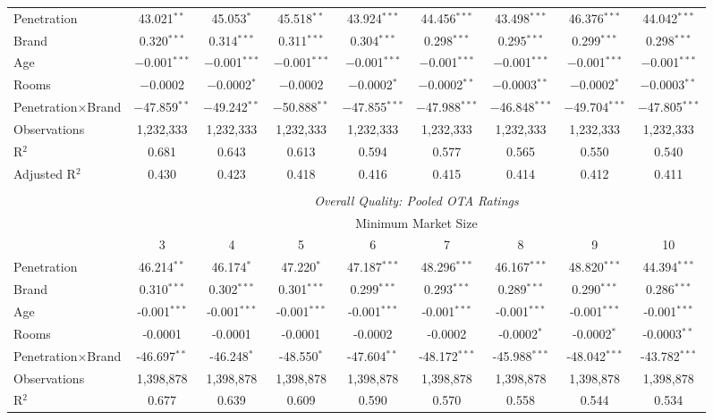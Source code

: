 \begin{table}[!htbp]
\begin{sideways}
{\begin{tabular}{@{\extracolsep{5pt}}lcccccccc}
\hline 
 Penetration & 43.021$^{**}$ & 45.053$^{*}$ & 45.518$^{**}$ & 43.924$^{***}$ & 44.456$^{***}$ & 43.498$^{***}$ & 46.376$^{***}$ & 44.042$^{***}$ \\  
  Brand & 0.320$^{***}$ & 0.314$^{***}$ & 0.311$^{***}$ & 0.304$^{***}$ & 0.298$^{***}$ & 0.295$^{***}$ & 0.299$^{***}$ & 0.298$^{***}$ \\   
  Age & $-$0.001$^{***}$ & $-$0.001$^{***}$ & $-$0.001$^{***}$ & $-$0.001$^{***}$ & $-$0.001$^{***}$ & $-$0.001$^{***}$ & $-$0.001$^{***}$ & $-$0.001$^{***}$ \\ 
  Rooms & $-$0.0002 & $-$0.0002$^{*}$ & $-$0.0002 & $-$0.0002$^{*}$ & $-$0.0002$^{**}$ & $-$0.0003$^{**}$ & $-$0.0002$^{*}$ & $-$0.0003$^{**}$ \\  
  Penetration$\times$Brand & $-$47.859$^{**}$ & $-$49.242$^{**}$ & $-$50.888$^{**}$ & $-$47.855$^{***}$ & $-$47.988$^{***}$ & $-$46.848$^{***}$ & $-$49.704$^{***}$ & $-$47.805$^{***}$ \\
 \hline
Observations & 1,232,333 & 1,232,333 & 1,232,333 & 1,232,333 & 1,232,333 & 1,232,333 & 1,232,333 & 1,232,333 \\ 
R$^{2}$ & 0.681 & 0.643 & 0.613 & 0.594 & 0.577 & 0.565 & 0.550 & 0.540 \\ 
Adjusted R$^{2}$ & 0.430 & 0.423 & 0.418 & 0.416 & 0.415 & 0.414 & 0.412 & 0.411 \\ 
\hline 
\\[-1.8ex]
& \multicolumn{8}{c}{\textit{Overall Quality: Pooled OTA Ratings}} \\ 
\cline{2-9} 
& \multicolumn{8}{c}{Minimum Market Size} \\ 
 & 3 & 4 & 5 & 6 & 7 & 8 & 9 & 10\\ 
\hline  
 Penetration & 46.214$^{**}$ & 46.174$^{*}$ & 47.220$^{*}$ & 47.187$^{***}$ & 48.296$^{***}$ & 46.167$^{***}$ & 48.820$^{***}$ & 44.394$^{***}$ \\ 
  Brand & 0.310$^{***}$  & 0.302$^{***}$  & 0.301$^{***}$  & 0.299$^{***}$  & 0.293$^{***}$  & 0.289$^{***}$  & 0.290$^{***}$  & 0.286$^{***}$  \\ 
  Age & -0.001$^{***}$ & -0.001$^{***}$ & -0.001$^{***}$ & -0.001$^{***}$ & -0.001$^{***}$ & -0.001$^{***}$ & -0.001$^{***}$ & -0.001$^{***}$ \\
  Rooms& -0.0001 & -0.0001 & -0.0001 & -0.0002 & -0.0002 & -0.0002$^{*}$ & -0.0002$^{*}$ & -0.0003$^{**}$ \\ 
  Penetration$\times$Brand & -46.697$^{**}$ & -46.248$^{*}$ & -48.550$^{*}$ & -47.604$^{**}$ & -48.172$^{***}$ & -45.988$^{***}$ & -48.042$^{***}$ & -43.782$^{***}$ \\  
 \hline
Observations & 1,398,878 & 1,398,878 &  1,398,878 &  1,398,878 &  1,398,878 &  1,398,878 &  1,398,878 &  1,398,878\\ 
R$^{2}$ & 0.677 & 0.639 & 0.609 & 0.590 & 0.570 & 0.558 & 0.544 & 0.534 \\ 


\end{tabular}}
\end{sideways}
\end{table}
